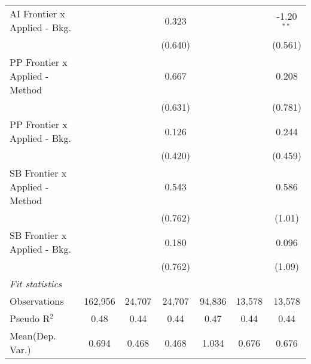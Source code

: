 \begin{tabular}{lcccccc}
   AI Frontier x Applied - Bkg.   &               &             & 0.323         &               &              & -1.20$^{**}$\\   
                                  &               &             & (0.640)       &               &              & (0.561)\\   
   PP Frontier x Applied - Method &               &             & 0.667         &               &              & 0.208\\   
                                  &               &             & (0.631)       &               &              & (0.781)\\   
   PP Frontier x Applied - Bkg.   &               &             & 0.126         &               &              & 0.244\\   
                                  &               &             & (0.420)       &               &              & (0.459)\\   
   SB Frontier x Applied - Method &               &             & 0.543         &               &              & 0.586\\   
                                  &               &             & (0.762)       &               &              & (1.01)\\   
   SB Frontier x Applied - Bkg.   &               &             & 0.180         &               &              & 0.096\\   
                                  &               &             & (0.762)       &               &              & (1.09)\\   
   \midrule
   \emph{Fit statistics}\\
   Observations                   & 162,956       & 24,707      & 24,707        & 94,836        & 13,578       & 13,578\\  
   Pseudo R$^2$                   & 0.48          & 0.44        & 0.44          & 0.47          & 0.44         & 0.44\\  
Mean(Dep. Var.) & 0.694 & 0.468 & 0.468 & 1.034 & 0.676 & 0.676 \\
   

\end{tabular}
